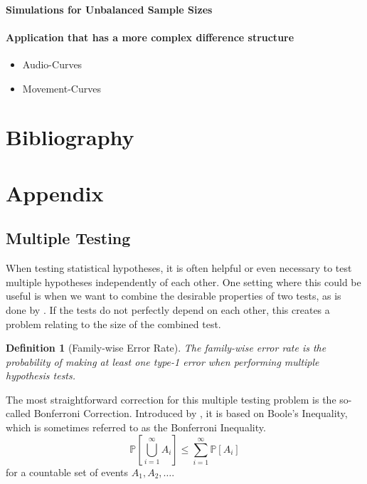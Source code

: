 \documentclass[12pt, a4paper]{article}
\theoremstyle{MAstyle} \newtheorem{assumption}{Assumption}[section]
\theoremstyle{MAstyle} \newtheorem{definition}{Definition}[section]
\begin{document}
		\paragraph{Simulations for Unbalanced Sample Sizes}
		
		\paragraph{Application that has a more complex difference structure}
			\begin{itemize}
				\item Audio-Curves
				\item Movement-Curves
			\end{itemize}
		
		
	
	\newpage
	\section{Bibliography}
	\printbibliography[heading=none]
	
	\newpage
	\cleardoublepage
	\setcounter{page}{1}
	\section{Appendix}
	
		\subsection{Multiple Testing}\label{Multiple_Testing}
			When testing statistical hypotheses, it is often helpful or even necessary to test multiple hypotheses independently of each other. One setting where this could be useful is when we want to combine the desirable properties of two tests, as is done by \cite{bugni_permutation_2021}. If the tests do not perfectly depend on each other, this creates a problem relating to the size of the combined test.
			
			\begin{definition}[Family-wise Error Rate]
				The family-wise error rate is the probability of making at least one type-1 error when performing multiple hypothesis tests.
			\end{definition}
		
				The most straightforward correction for this multiple testing problem is the so-called Bonferroni Correction. Introduced by \cite{dunn_multiple_1961}, it is based on Boole's Inequality, which is sometimes referred to as the Bonferroni Inequality.
				\begin{equation}
						\mathbb{P}\left[\bigcup_{i = 1}^{\infty} A_i\right] \leq \sum_{i = 1}^{\infty} \mathbb{P}\left[A_i\right]
					\end{equation}
				for a countable set of events $A_1, A_2, \dots$.
		
\end{document}
